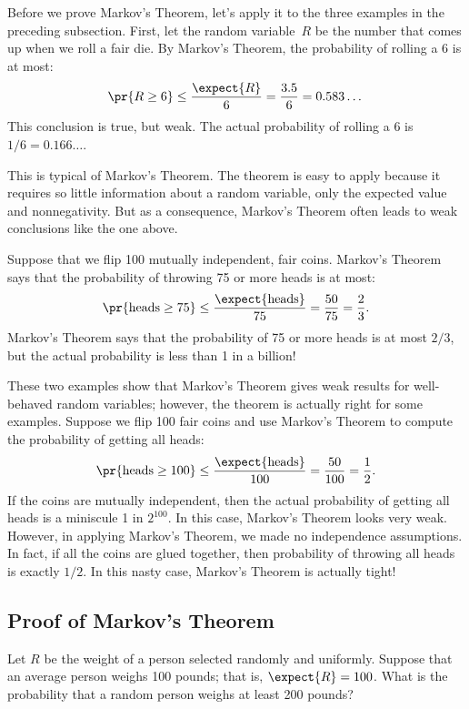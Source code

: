 \begin{editingnotes}

Before we prove Markov's Theorem, let's apply it to the three examples in
the preceding subsection.  First, let the random variable~$R$ be the
number that comes up when we roll a fair die.  By Markov's Theorem, the
probability of rolling a 6 is at most:
\[
\pr{R \geq 6} \leq \frac{\expect{R}}{6} = \frac{3.5}{6} = 0.583\dots
\]
This conclusion is true, but weak.  The actual probability of rolling
a 6 is $1/6 = 0.166\dots$.

This is typical of Markov's Theorem.  The theorem is easy to apply
because it requires so little information about a random variable,
only the expected value and nonnegativity.  But as a consequence,
Markov's Theorem often leads to weak conclusions like the one above.

Suppose that we flip 100 mutually independent, fair coins.  Markov's
Theorem says that the probability of throwing 75 or more heads is at
most:
\[
\pr{\text{heads} \geq 75} \leq \frac{\expect{\text{heads}}}{75} =
\frac{50}{75} = \frac{2}{3}.
\]
Markov's Theorem says that the probability of 75 or more heads is at
most $2/3$, but the actual probability is less than 1 in a
billion!

These two examples show that Markov's Theorem gives weak results for
well-behaved random variables; however, the theorem is actually right
for some examples.  Suppose we flip 100 fair coins and use Markov's
Theorem to compute the probability of getting all heads:
\[
\pr{\text{heads} \geq 100} \leq \frac{\expect{\text{heads}}}{100} =
\frac{50}{100} = \frac{1}{2}.
\]
If the coins are mutually independent, then the actual probability of
getting all heads is a miniscule 1 in $2^{100}$.  In this case, Markov's
Theorem looks very weak.  However, in applying Markov's Theorem, we made
no independence assumptions.  In fact, if all the coins are glued
together, then probability of throwing all heads is exactly $1/2$.
In this nasty case, Markov's Theorem is actually tight!

\subsection{Proof of Markov's Theorem}

Let $R$ be the weight of a person selected randomly and uniformly.
Suppose that an average person weighs 100 pounds; that is, $\expect{R} =
100$.  What is the probability that a random person weighs at least
200 pounds?


\end{editingnotes}

